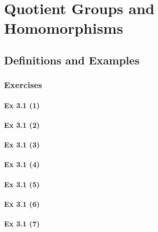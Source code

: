 \setcounter{chapter}{0}
\renewcommand{\thechapter}{3}
\chapter{Quotient Groups and Homomorphisms}\label{ch:3}
\setcounter{equation}{0}	        %

\section{Definitions and Examples}\label{sec:3.1}	
\subsection*{Exercises}\label{sec:3.1_Exercises}

\subsubsection{Ex 3.1 (1)}\label{sec:Ex_3.1.1}

\subsubsection{Ex 3.1 (2)}\label{sec:Ex_3.1.2}

\subsubsection{Ex 3.1 (3)}\label{sec:Ex_3.1.3}

\subsubsection{Ex 3.1 (4)}\label{sec:Ex_3.1.4}

\subsubsection{Ex 3.1 (5)}\label{sec:Ex_3.1.5}

\subsubsection{Ex 3.1 (6)}\label{sec:Ex_3.1.6}

\subsubsection{Ex 3.1 (7)}\label{sec:Ex_3.1.7}

